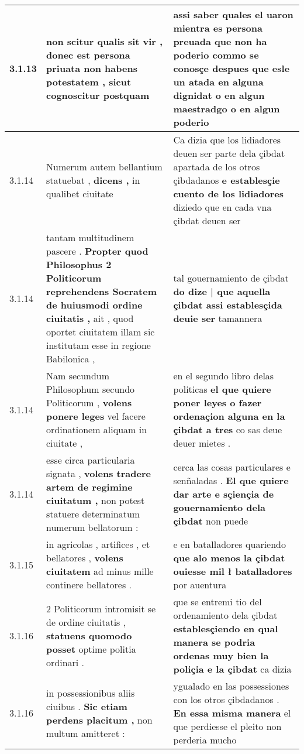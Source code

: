 \begin{tabular}{|p{1cm}|p{6.5cm}|p{6.5cm}|}
3.1.13 & non scitur qualis sit vir , \textbf{ donec est persona priuata non habens potestatem , } sicut cognoscitur postquam & assi saber quales el uaron mientra es persona preuada \textbf{ que non ha poderio } commo se conosçe despues que esle un atada en alguna dignidat o en algun maestradgo o en algun poderio \\\hline
3.1.14 & Numerum autem bellantium statuebat , \textbf{ dicens , } in qualibet ciuitate & Ca dizia que los lidiadores deuen ser parte dela çibdat apartada de los otros çibdadanos \textbf{ e establesçie cuento de los lidiadores } diziedo que en cada vna çibdat deuen ser \\\hline
3.1.14 & tantam multitudinem pascere . \textbf{ Propter quod Philosophus 2 Politicorum reprehendens Socratem de huiusmodi ordine ciuitatis , } ait , quod oportet ciuitatem illam sic institutam esse in regione Babilonica , & tal gouernamiento de çibdat \textbf{ do dize | que aquella çibdat assi establesçida deuie ser } tamannera \\\hline
3.1.14 & Nam secundum Philosophum secundo Politicorum , \textbf{ volens ponere leges } vel facere ordinationem aliquam in ciuitate , & en el segundo libro delas politicas \textbf{ el que quiere poner leyes o fazer ordenaçion alguna en la çibdat a tres } co sas deue deuer mietes . \\\hline
3.1.14 & esse circa particularia signata , \textbf{ volens tradere artem de regimine ciuitatum , } non potest statuere determinatum numerum bellatorum : & cerca las cosas particulares e senñaladas . \textbf{ El que quiere dar arte e sçiençia de gouernamiento dela çibdat } non puede \\\hline
3.1.15 & in agricolas , artifices , et bellatores , \textbf{ volens ciuitatem } ad minus mille continere bellatores . & e en batalladores quariendo \textbf{ que alo menos la çibdat ouiesse mil ł batalladores } por auentura \\\hline
3.1.16 & 2 Politicorum intromisit se de ordine ciuitatis , \textbf{ statuens quomodo posset } optime politia ordinari . & que se entremi tio del ordenamiento dela çibdat \textbf{ establesçiendo en qual manera se podria ordenas muy bien la poliçia e la çibdat } ca dizia \\\hline
3.1.16 & in possessionibus aliis ciuibus . \textbf{ Sic etiam perdens placitum , } non multum amitteret : & ygualado en las possessiones con los otros çibdadanos . \textbf{ En essa misma manera } el que perdiesse el pleito non perderia mucho \\\hline

\end{tabular}
